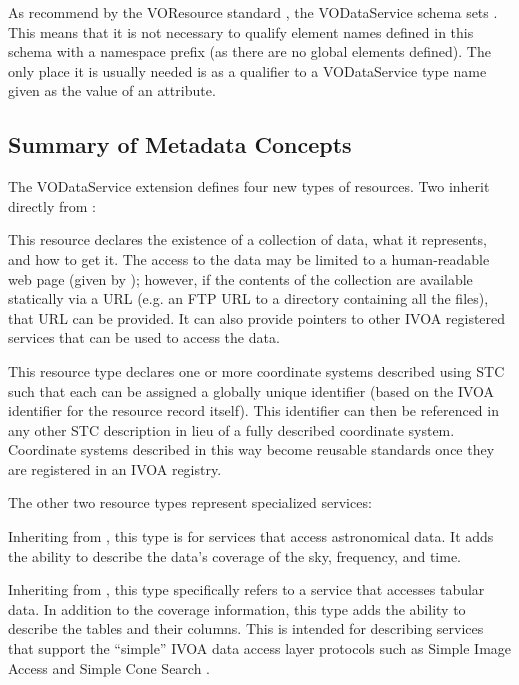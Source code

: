 \documentclass[11pt,a4paper]{ivoa}
\begin{document}
As recommend by the VOResource standard \citep{VOR}, the
VODataService schema sets .
This means that it is not necessary to qualify element names defined
in this schema with a namespace prefix (as there are no global
elements defined).  The only place it is usually needed is as a
qualifier to a VODataService type name given as the value of an
 attribute.  


\subsection{Summary of Metadata Concepts}
\label{sect:summ}


The VODataService extension defines four new types of resources.  Two inherit
directly from :


\begin{bigdescription}
\item[\xmlel{vs:DataCollection}]
This resource declares the existence of a collection of data, what
       it represents, and how to get it.  The access to the data may be
       limited to a human-readable web page (given by
       ); however, if the
       contents of the collection are available statically via a
       URL (e.g. an FTP URL to a directory containing all the files),
       that URL can be provided.  It can also provide pointers to
       other IVOA registered services that can be used to access the data.

\item[\xmlel{vs:StandardSTC}]
This resource type declares one or more coordinate systems described
       using STC \citep{STC} such that each can be
       assigned a globally unique identifier (based on the IVOA
       identifier for the resource record itself).  This identifier
       can then be referenced in any other STC description in lieu of
       a fully described coordinate system.  Coordinate systems
       described in this way become reusable standards once they are
       registered in an IVOA registry.
\end{bigdescription}

The other two resource types represent specialized services:


\begin{bigdescription}
\item[\xmlel{vs:DataService}]
Inheriting from , this type is for
       services that access astronomical data.  It adds the ability to
       describe the data's coverage of the
       sky, frequency, and time.

\item[\xmlel{vs:CatalogService}]
Inheriting from , this type
       specifically refers to a service that accesses tabular data.
       In addition to the coverage information, this type adds the
       ability to describe the tables and their columns.  This is
       intended for describing services that support the ``simple'' IVOA
       data access layer protocols such as Simple Image Access
       \citep{SIA} and Simple Cone Search
       \citep{SCS}.
\end{bigdescription}
\end{document}
